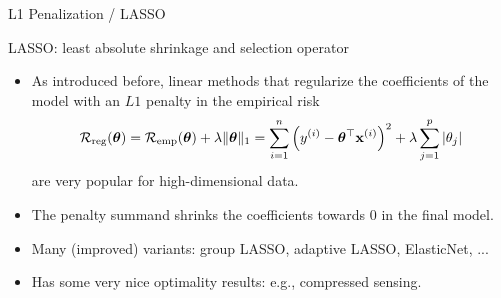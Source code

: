 \documentclass[11pt,compress,t,notes=noshow, xcolor=table]{beamer}
\begin{document}
  \begin{vbframe}{L1 Penalization / LASSO}

    LASSO: least absolute shrinkage and selection operator
    \begin{itemize}
      \item As introduced before, linear methods that regularize the coefficients of the model with an $L1$ penalty in the empirical risk
      $$ \mathcal{R}_{\text{reg}}(\bm{\theta}) = \mathcal{R}_{\text{emp}}(\bm{\theta}) + \lambda \|\bm{\theta}\|_1 = \sum\limits_{i=1}^n \left(y^{(i)} - \bm{\theta}^\top \mathbf{x}^{(i)} \right)^2 +\lambda \sum_{j=1}^p |\theta_j| $$
      are very popular for high-dimensional data.
      \item The penalty summand shrinks the coefficients towards 0 in the final model.
      \item Many (improved) variants: group LASSO, adaptive LASSO, ElasticNet, ...
      \item Has some very nice optimality results: e.g., compressed sensing.
    \end{itemize}
  \end{vbframe}


  \endlecture
\end{document}
